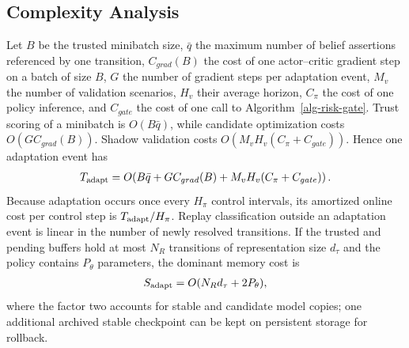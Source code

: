 \subsection{Complexity Analysis}
Let $B$ be the trusted minibatch size, $\bar q$ the maximum number of belief assertions referenced by one transition, $C_{grad}(B)$ the cost of one actor--critic gradient step on a batch of size $B$, $G$ the number of gradient steps per adaptation event, $M_v$ the number of validation scenarios, $H_v$ their average horizon, $C_\pi$ the cost of one policy inference, and $C_{gate}$ the cost of one call to Algorithm~\ref{alg-risk-gate}. Trust scoring of a minibatch is $O(B\bar q)$, while candidate optimization costs $O(GC_{grad}(B))$. Shadow validation costs $O(M_vH_v(C_\pi+C_{gate}))$. Hence one adaptation event has
\begin{align}
\label{eq-complexity-trust-policy}
T_{\rm adapt}=O\!\left(
B\bar q+GC_{grad}(B)+M_vH_v(C_\pi+C_{gate})
\right).
\end{align}
Because adaptation occurs once every $H_\pi$ control intervals, its amortized online cost per control step is $T_{\rm adapt}/H_\pi$. Replay classification outside an adaptation event is linear in the number of newly resolved transitions. If the trusted and pending buffers hold at most $N_R$ transitions of representation size $d_\tau$ and the policy contains $P_\theta$ parameters, the dominant memory cost is
\begin{align}
\label{eq-space-trust-policy}
S_{\rm adapt}=O(N_Rd_\tau+2P_\theta),
\end{align}
where the factor two accounts for stable and candidate model copies; one additional archived stable checkpoint can be kept on persistent storage for rollback.
